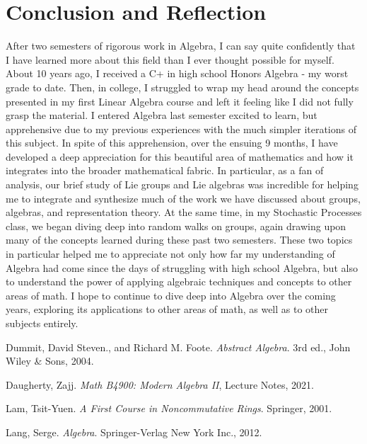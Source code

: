 \documentclass[11pt, reqno]{amsart}
\theoremstyle{plain}
\theoremstyle{definition}
\theoremstyle{example}
\begin{document}
\section{Conclusion and Reflection}

\par
After two semesters of rigorous work in Algebra, I can say quite confidently that I have learned more about this field than I ever thought possible for myself. About 10 years ago, I received a C+ in high school Honors Algebra - my worst grade to date. Then, in college, I struggled to wrap my head around the concepts presented in my first Linear Algebra course and left it feeling like I did not fully grasp the material. I entered Algebra last semester excited to learn, but apprehensive due to my previous experiences with the much simpler iterations of this subject. In spite of this apprehension, over the ensuing 9 months, I have developed a deep appreciation for this beautiful area of mathematics and how it integrates into the broader mathematical fabric. In particular, as a fan of analysis, our brief study of Lie groups and Lie algebras was incredible for helping me to integrate and synthesize much of the work we have discussed about groups, algebras, and representation theory. At the same time, in my Stochastic Processes class, we began diving deep into random walks on groups, again drawing upon many of the concepts learned during these past two semesters. These two topics in particular helped me to appreciate not only how far my understanding of Algebra had come since the days of struggling with high school Algebra, but also to understand the power of applying algebraic techniques and concepts to other areas of math. I hope to continue to dive deep into Algebra over the coming years, exploring its applications to other areas of math, as well as to other subjects entirely.


\newpage
\begin{thebibliography}{9}

Dummit, David Steven., and Richard M. Foote. \textit{Abstract Algebra}. 3rd ed., John Wiley \& Sons, 2004. 

Daugherty, Zajj. \textit{Math B4900: Modern Algebra II}, Lecture Notes, 2021.

Lam, Tsit-Yuen. \textit{A First Course in Noncommutative Rings}. Springer, 2001. 

Lang, Serge. \textit{Algebra}. Springer-Verlag New York Inc., 2012. 

\end{thebibliography}
\end{document}
